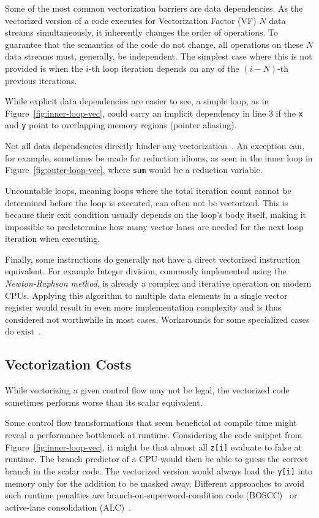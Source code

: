 \documentclass[sigplan,11pt,nonacm]{acmart}
\begin{document}
Some of the most common vectorization barriers are data dependencies. As the vectorized version
of a code executes for Vectorization Factor (VF) $N$ data streams simultaneously, it inherently changes
the order of operations. To guarantee that the semantics of the code do not change, all
operations on these $N$ data streams must, generally, be independent. The simplest case
where this is not provided is when the $i$-th loop iteration depends on any of the $(i-N)$-th 
previous iterations.

While explicit data dependencies are easier to see, a simple loop, as in 
Figure~\ref{fig:inner-loop-vec}, could carry an implicit dependency in line 3 if
the \texttt{x} and \texttt{y} point to overlapping memory regions (pointer aliasing).

Not all data dependencies directly hinder any vectorization~\cite{datadepvec}. An exception can, for example, 
sometimes be made for reduction idioms, as seen in the inner loop in 
Figure~\ref{fig:outer-loop-vec}, where \texttt{sum} would be a reduction variable.

Uncountable loops, meaning loops where the total iteration count cannot be determined before the 
loop is executed, can often not be vectorized. This is because their exit condition usually depends on 
the loop's body itself, making it impossible to predetermine how many vector lanes are needed for the next 
loop iteration when executing.

Finally, some instructions do generally not have a direct vectorized 
instruction equivalent. For example Integer division, commonly implemented using the 
\textit{Newton-Raphson method}, is already a complex and iterative operation 
on modern CPUs. Applying this algorithm 
to multiple data elements in a single vector register would result in even more implementation complexity 
and is thus considered not worthwhile in most cases.
Workarounds for some specialized cases do exist~\cite{vecintdiv}.

\subsection{Vectorization Costs}
While vectorizing a given control flow may not be legal, the vectorized code sometimes performs 
worse than its scalar equivalent.

Some control flow transformations that seem beneficial at compile time might reveal a performance
bottleneck at runtime. Considering the code snippet from Figure~\ref{fig:inner-loop-vec}, it might
be that almost all \texttt{z[i]} evaluate to false at runtime. The branch predictor of a CPU
would then be able to guess the correct branch in the scalar code. The vectorized version would
always load the \texttt{y[i]} into memory only for the addition to be masked away. Different 
approaches to avoid such runtime penalties are branch-on-superword-condition code 
(BOSCC)~\cite{10.5555/1299042.1299055,llvmboscc} or active-lane 
consolidation (ALC)~\cite{10.1007/s11227-022-04359-w,10.5555/3615924.3615932}.
\end{document}
